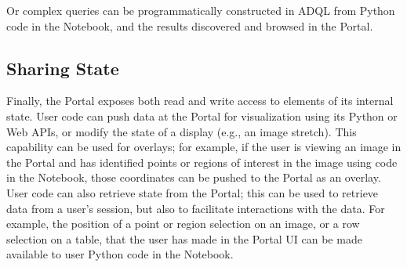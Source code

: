 Or complex queries can be programmatically constructed in ADQL from Python code in the Notebook, and the results discovered and browsed in the Portal.

\subsection{Sharing State}\label{sharing-state}

Finally, the Portal exposes both read and write access to elements of its internal state.
User code can push data at the Portal for visualization using its Python or Web APIs, or modify the state of a display (e.g., an image stretch).
This capability can be used for overlays; for example, if the user is viewing an image in the Portal and has identified points or regions of interest in the image using code in the Notebook, those coordinates can be pushed to the Portal as an overlay.
User code can also retrieve state from the Portal; this can be used to retrieve data from a user's session, but also to facilitate interactions with the data.
For example, the position of a point or region selection on an image, or a row selection on a table, that the user has made in the Portal UI can be made available to user Python code in the Notebook.
